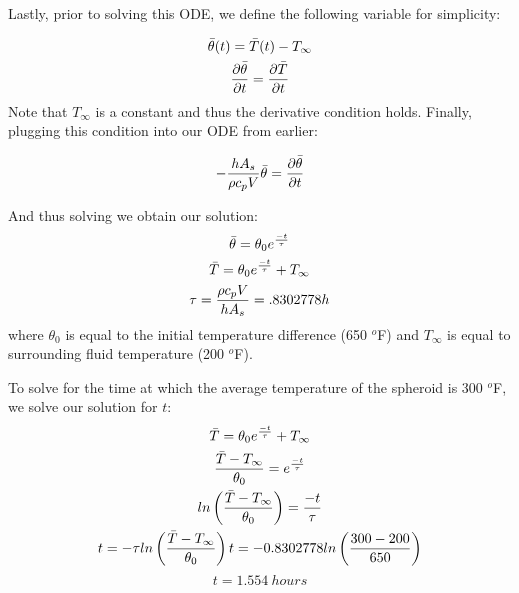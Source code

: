 \documentclass{article}
\begin{document}
Lastly, prior to solving this ODE, we define the following variable for simplicity:

\begin{equation}
    \begin{gathered}
    \Bar{\theta}(t) = \Bar{T}(t) - T_{\infty}\\
    \frac{\partial \Bar{\theta}}{\partial t} = \frac{\partial \Bar{T}}{\partial t}
    \end{gathered}
\end{equation}
Note that $T_{\infty}$ is a constant and thus the derivative condition holds. Finally, plugging this condition into our ODE from earlier:

\begin{equation}
    -\frac{h A_s }{\rho c_p V} \Bar{\theta} = \frac{\partial \Bar{\theta}}{\partial t}
\end{equation}

And thus solving we obtain our solution:
\begin{equation}
    \begin{gathered}
        \Bar{\theta} = \theta_0 e^{\frac{-t}{\tau}} \\
        \Bar{T} = \theta_0 e^{\frac{-t}{\tau}} + T_{\infty} \\
        \tau = \frac{\rho c_p V}{h A_s} = .8302778 h
    \end{gathered}
\end{equation}
where $\theta_0$ is equal to the initial temperature difference (650 $^o$F) and $T_{\infty}$ is equal to surrounding fluid temperature (200 $^o$F). 

To solve for the time at which the average temperature of the spheroid is 300 $^o$F, we solve our solution for $t$:
\begin{equation}
    \begin{gathered}
        \Bar{T} = \theta_0 e^{\frac{-t}{\tau}} + T_{\infty} \\
        \frac{\Bar{T} - T_{\infty}}{\theta_0} = e^{\frac{-t}{\tau}} \\
        ln\left(\frac{\Bar{T} - T_{\infty}}{\theta_0}\right) = \frac{-t}{\tau} \\
        t = -\tau ln\left(\frac{\Bar{T} - T_{\infty}}{\theta_0}\right)
        t = - 0.8302778 ln\left(\frac{300 - 200}{650}\right)
    \end{gathered}
\end{equation}
\[
\boxed{t = 1.554 \ hours}
\]
\end{document}
